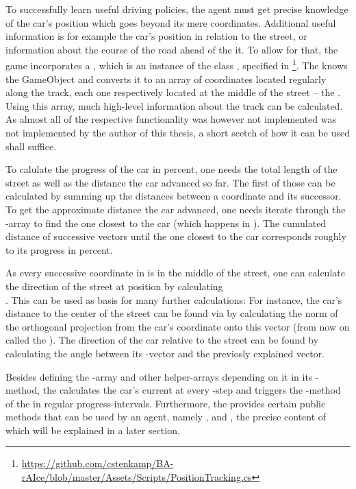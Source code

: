 To successfully learn useful driving policies, the agent must get precise knowledge of the car's position which goes beyond its mere coordinates. Additional useful information is for example the car's position in relation to the street, or information about the course of the road ahead of the it. To allow for that, the game incorporates a , which is an instance of the class , specified in \footnote{\url{https://github.com/cstenkamp/BA-rAIce/blob/master/Assets/Scripts/PositionTracking.cs}}\byLeon. The  knows the GameObject  and converts it to an array of coordinates located regularly along the track, each one respectively located at the middle of the street -- the . Using this array, much high-level information about the track can be calculated. As almost all of the respective functionality was however not implemented was not implemented by the author of this thesis, a short scetch of how it can be used shall suffice.

To calulate the progress of the car in percent, one needs the total length of the street as well as the distance the car advanced so far. The first of those can be calculated by summing up the distances between a coordinate and its successor. To get the approximate distance the car advanced, one needs iterate through the -array to find the one closest to the car (which happens in ). The cumulated distance of successive vectors until the one closest to the car corresponds roughly to its progress in percent. 

As every successive coordinate in  is in the middle of the street, one can calculate the direction of the street at position  by calculating\\ . This can be used as basis for many further calculations: For instance, the car's distance to the center of the street can be found via by calculating the norm of the orthogonal projection from the car's coordinate onto this vector (from now on called the ). The direction of the car relative to the street can be found by calculating the angle between its -vector and the previosly explained vector.

Besides defining the -array and other helper-arrays depending on it in its -method, the  calculates the car's current  at every -step and triggers the -method of the  in regular progress-intervals. Furthermore, the  provides certain public methods that can be used by an agent, namely ,  and , the precise content of which will be explained in a later section.

